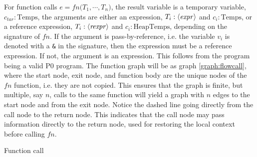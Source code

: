 For function calls $e = \mathit{fn}\texttt{(}T_1,\cdots, T_n\texttt{)}$, the result variable is a temporary variable, $c_{tar}:\text{Temps}$, the arguments are either an expression, $T_i : \langle\mathit{expr}\rangle$ and $c_i : \text{Temps}$, or a reference expression, $T_i : \langle\mathit{rexpr}\rangle$ and $c_i : \text{HeapTemps}$, depending on the signature of $\mathit{fn}$. If the argument is pass-by-reference, i.e. the variable $v_i$ is denoted with a \texttt{\&} in the signature, then the expression must be a reference expression. If not, the argument is an expression. This follows from the program being a valid P0 program. The function graph will be as graph \ref{graph:flowcall}, where the start node, exit node, and function body are the unique nodes of the $\mathit{fn}$ function, i.e. they are not copied. This ensures that the graph is finite, but multiple, say $n$, calls to the same function will yield a graph with $n$ edges to the start node and from the exit node. Notice the dashed line going directly from the call node to the return node. This indicates that the call node may pass information directly to the return node, used for restoring the local context before calling $\mathit{fn}$.

\begin{graph}
\centering
\captionsetup{justification=centering}
\begin{adjustbox}{max size={.3\textwidth}{.40\textheight}}\end{adjustbox}
\caption{Function call \label{graph:flowcall}}
\end{graph}

